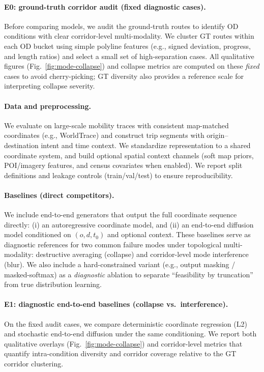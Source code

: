 \label{sec:experiments}

\paragraph{E0: ground-truth corridor audit (fixed diagnostic cases).}
Before comparing models, we audit the ground-truth routes to identify OD conditions with clear corridor-level multi-modality.
We cluster GT routes within each OD bucket using simple polyline features (e.g., signed deviation, progress, and length ratios) and select a small set of high-separation cases.
All qualitative figures (Fig.~\ref{fig:mode-collapse}) and collapse metrics are computed on these \emph{fixed} cases to avoid cherry-picking; GT diversity also provides a reference scale for interpreting collapse severity.

\paragraph{Data and preprocessing.}
We evaluate on large-scale mobility traces with consistent map-matched coordinates (e.g., WorldTrace) and construct trip segments with origin--destination intent and time context.
We standardize representation to a shared coordinate system, and build optional spatial context channels (soft map priors, POI/imagery features, and census covariates when enabled).
We report split definitions and leakage controls (train/val/test) to ensure reproducibility.

\paragraph{Baselines (direct competitors).}
We include end-to-end generators that output the full coordinate sequence directly:
(i) an autoregressive coordinate model, and
(ii) an end-to-end diffusion model \citep{ho2020ddpm} conditioned on $(o,d,t_0)$ and optional context.
These baselines serve as diagnostic references for two common failure modes under topological multi-modality: destructive averaging (collapse) and corridor-level mode interference (blur).
We also include a hard-constrained variant (e.g., output masking / masked-softmax) as a \emph{diagnostic} ablation to separate ``feasibility by truncation'' from true distribution learning.

\paragraph{E1: diagnostic end-to-end baselines (collapse vs.\ interference).}
On the fixed audit cases, we compare deterministic coordinate regression (L2) and stochastic end-to-end diffusion under the same conditioning.
We report both qualitative overlays (Fig.~\ref{fig:mode-collapse}) and corridor-level metrics that quantify intra-condition diversity and corridor coverage relative to the GT corridor clustering.

